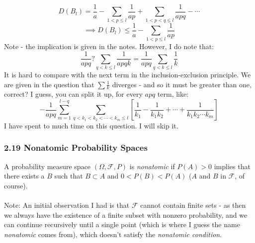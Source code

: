 \documentclass[12pt,a4paper]{article}
\newcommand{\1}[1]{\mathbbm{1}\left\{ #1 \right\}}
\newcommand{\fcal}{\mathcal{F}}
\begin{document}
$$
	D(B_l) = \frac{1}{a} - \sum_{1 < p \leq l} \frac{1}{ap} + \sum_{1 < p < q \leq l} \frac{1}{apq} - \cdots
$$
$$
	\implies
	D(B_l) \leq \frac{1}{a} - \sum_{1 < p \leq l} \frac{1}{ap}
$$
Note - the implication is given in the notes. However, I do note that:
$$
	\frac{1}{apq} ? \sum_{q < k \leq l} \frac{1}{apqk} = \frac{1}{apq}\sum_{q < k \leq l} \frac{1}{k}
$$
It is hard to compare with the next term in the inclusion-exclusion principle. We are given in the question that $\sum \frac{1}{k}$ diverges - and so it must be greater than one, correct? I guess, you can split it up, for every $apq$ term, like:
$$
	-\frac{1}{apq} \sum_{m=1}^{l - q} \sum_{q < k_1 < k_2 < \cdots < k_m \leq l}
	\left[\frac{1}{k_1} - \frac{1}{k_1k_2} + \cdots + \frac{1}{k_1k_2\cdots k_m}\right]
$$
I have spent to much time on this question. I will skip it.

\subsubsection{2.19 Nonatomic Probability Spaces} A probability measure space $(\Omega, \fcal, P)$ is \textit{nonatomic} if $P(A) > 0$ implies that there exists a $B$ such that $B \subset A$ and $0 < P(B) < P(A)$ ($A$ and $B$ in $\fcal$, of course).
\\\\
Note: An initial observation I had is that $\fcal$ cannot contain finite sets - as then we always have the existence of a finite subset with nonzero probability, and we can continue recursively until a single point (which is where I guess the name \textit{nonatomic} comes from), which doesn't satisfy the \textit{nonatomic condition}.
\end{document}
